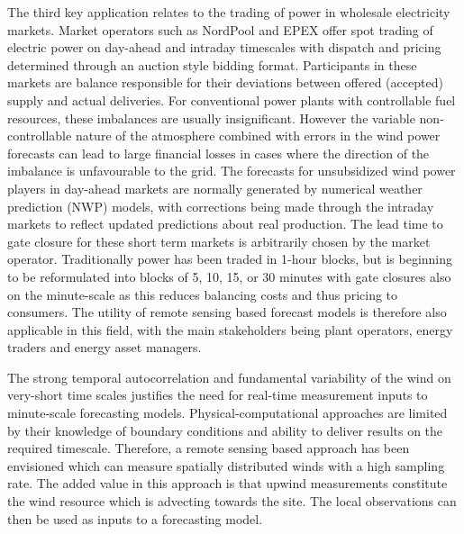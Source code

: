 The third key application relates to the trading of power in wholesale electricity markets. Market operators such as NordPool and EPEX offer spot trading of electric power on day-ahead and intraday timescales with dispatch and pricing determined through an auction style bidding format. Participants in these markets are balance responsible for their deviations between offered (accepted) supply and actual deliveries. For conventional power plants with controllable fuel resources, these imbalances are usually insignificant. However the variable non-controllable nature of the atmosphere combined with errors in the wind power forecasts can lead to large financial losses in cases where the direction of the imbalance is unfavourable to the grid. The forecasts for unsubsidized wind power players in day-ahead markets are normally generated by numerical weather prediction (NWP) models, with corrections being made through the intraday markets to reflect updated predictions about real production. The lead time to gate closure for these short term markets is arbitrarily chosen by the market operator. Traditionally power has been traded in 1-hour blocks, but is beginning to be reformulated into blocks of 5, 10, 15, or 30 minutes with gate closures also on the minute-scale as this reduces balancing costs and thus pricing to consumers. The utility of remote sensing based forecast models is therefore also applicable in this field, with the main stakeholders being plant operators, energy traders and energy asset managers.

The strong temporal autocorrelation and fundamental variability of the wind on very-short time scales justifies the need for real-time measurement inputs to minute-scale forecasting models. Physical-computational approaches are limited by their knowledge of boundary conditions and ability to deliver results on the required timescale. Therefore, a remote sensing based approach has been envisioned which can measure spatially distributed winds with a high sampling rate. The added value in this approach is that upwind measurements constitute the wind resource which is advecting towards the site. The local observations can then be used as inputs to a forecasting model.

